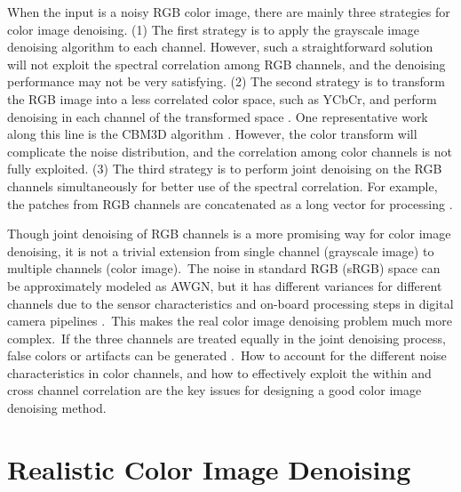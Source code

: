 When the input is a noisy RGB color image, there are mainly three strategies for color image denoising. (1) The first strategy is to apply the grayscale image denoising algorithm to each channel. However, such a straightforward solution
will not exploit the spectral correlation among RGB channels, and the denoising performance may not be very satisfying. (2) The second strategy is to transform the RGB image into a less correlated color space, such as YCbCr, and perform denoising in each channel of the transformed space \cite{foe,cbm3d}. One representative work along this line is the CBM3D algorithm \cite{cbm3d}. However, the color transform will complicate the noise distribution, and the correlation among color channels is not fully exploited. (3) The third strategy is to perform joint denoising on the RGB channels simultaneously for better use of the spectral correlation. For example, the patches from RGB channels are concatenated as a long vector for processing \cite{mairal2008sparse,Zhu_2016_CVPR}.

Though joint denoising of RGB channels is a more promising way for color image denoising, it is not a trivial extension from single channel (grayscale image) to multiple channels (color image).\ The noise in standard RGB (sRGB) space can be approximately modeled as AWGN, but it has different variances for different channels \cite{Liu2008,Leungtip,crosschannel2016} due to the sensor characteristics and on-board processing steps in digital camera pipelines \cite{crosschannel2016,karaimer_brown_ECCV_2016}.\ This makes the real color image denoising problem much more complex.\ If the three channels are treated equally in the joint denoising process, false colors or artifacts can be generated \cite{mairal2008sparse}.\ How to account for the different noise characteristics in color channels, and how to effectively exploit the within and cross channel correlation are the key issues for designing a good color image denoising method.



\section{Realistic Color Image Denoising}
\label{sec:review:feature}

